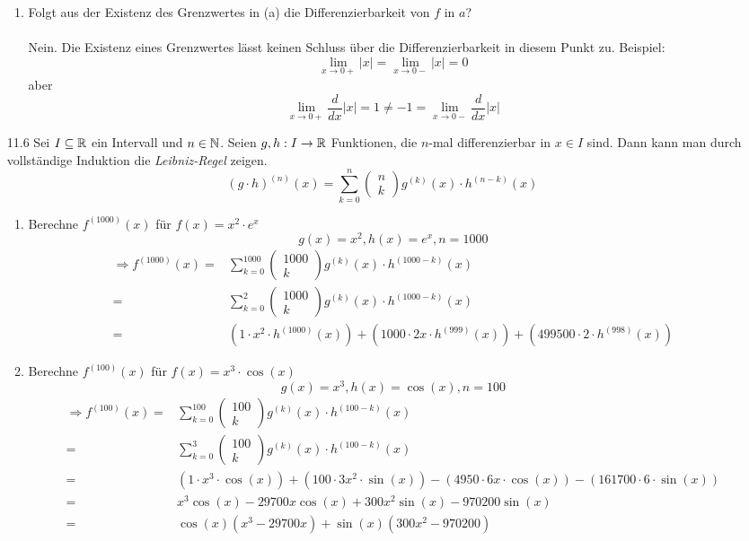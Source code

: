 \documentclass{HM}
\begin{document}
\begin{enumerate}
\begin{enumerate}
	\item Folgt aus der Existenz des Grenzwertes in (a) die Differenzierbarkeit von $f$ in $a$?\\\\
	Nein. Die Existenz eines Grenzwertes lässt keinen Schluss über die Differenzierbarkeit in diesem Punkt zu. Beispiel:\\
	$$\lim\limits_{x\to 0+}|x|=\lim\limits_{x\to 0-}|x|=0$$
	aber $$\lim\limits_{x\to 0+}\frac{d}{dx}|x|=1\not=-1=\lim\limits_{x\to 0-}\frac{d}{dx}|x|$$
\end{enumerate}
\newpage
\item [11.6] Sei $I\subseteq\mathbb{R}$ ein Intervall und $n\in\mathbb{N}$. Seien $g,h:I\to\mathbb{R}$ Funktionen, die $n$-mal differenzierbar in $x\in I$ sind. Dann kann man durch vollständige Induktion die \textit{Leibniz-Regel} zeigen.
$$(g\cdot h)^{(n)}(x)=\sum\limits_{k=0}^n\begin{pmatrix}
n\\k
\end{pmatrix}g^{(k)}(x)\cdot h^{(n-k)}(x)$$
\begin{enumerate}
	\item Berechne $f^{(1000)}(x)$ für $f(x)=x^2\cdot e^x$\\
	$$g(x)=x^2, h(x)=e^x, n=1000$$
	\begin{align*}
	\Rightarrow f^{(1000)}(x)=&\sum\limits_{k=0}^{1000}\begin{pmatrix}
1000\\k
\end{pmatrix} g^{(k)}(x)\cdot h^{(1000-k)}(x)\\
=&\sum\limits_{k=0}^{2}\begin{pmatrix}
1000\\k
\end{pmatrix}g^{(k)}(x)\cdot h^{(1000-k)}(x)\\
=&(1\cdot x^2\cdot h^{(1000)}(x))+(1000\cdot 2x\cdot h^{(999)}(x))+
(499500\cdot 2\cdot h^{(998)}(x))
	\end{align*}
	\item Berechne $f^{(100)}(x)$ für $f(x)=x^3\cdot \cos(x)$\\
	$$g(x)=x^3, h(x)=\cos(x), n=100$$
	\begin{align*}
	\Rightarrow f^{(100)}(x)=&\sum\limits_{k=0}^{100}\begin{pmatrix}
100\\k
\end{pmatrix} g^{(k)}(x)\cdot h^{(100-k)}(x)\\
=&\sum\limits_{k=0}^{3}\begin{pmatrix}
100\\k
\end{pmatrix}g^{(k)}(x)\cdot h^{(100-k)}(x)\\
=&(1\cdot x^3\cdot \cos(x))+(100\cdot 3x^2\cdot \sin(x))-(4950\cdot 6x\cdot \cos(x))-(161700\cdot 6\cdot \sin(x))\\
=&x^3\cos(x)-29700x\cos(x)+300x^2\sin(x)-970200\sin(x)\\
=&\cos(x)(x^3-29700x)+\sin(x)(300x^2-970200)
	\end{align*}
\end{enumerate}
\end{enumerate}
\end{document}
